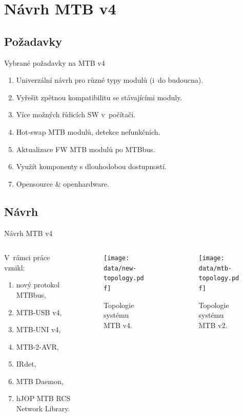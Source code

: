 \documentclass[aspectratio=169]{beamer}
\begin{document}

\section{Návrh MTB v4}
\subsection{Požadavky}

\begin{frame}{Vybrané požadavky na MTB v4}
\begin{enumerate}
\item Univerzální návrh pro různé typy modulů (i do budoucna).
\item Vyřešit zpětnou kompatibilitu se stávajícími moduly.
\item Více možných řídicích SW v počítači.
\item Hot-swap MTB modulů, detekce nefunkčních.
\item Aktualizace FW MTB modulů po MTBbus.
\item Využít komponenty s dlouhodobou dostupností.
\item Opensource \& openhardware.
\end{enumerate}
\end{frame}


\subsection{Návrh}

\begin{frame}{Návrh MTB v4}
\begin{columns}
	\begin{column}{.3\textwidth}
		V rámci práce vznikl:
		\begin{enumerate}
		\item nový protokol MTBbus,
		\item MTB-USB v4,
		\item MTB-UNI v4,
		\item MTB-2-AVR,
		\item IRdet,
		\item MTB Daemon,
		\item hJOP MTB RCS Network Library.
		\end{enumerate}
	\end{column}
	\begin{column}{.4\textwidth}
		\begin{figure}
		\texttt{[image: data/new-topology.pdf]}
		\caption{Topologie systému MTB v4.}
		\end{figure}
	\end{column}
	\begin{column}{.3\textwidth}
		\begin{figure}
		\texttt{[image: data/mtb-topology.pdf]}
		\caption{Topologie systému MTB v2.}
		\end{figure}
	\end{column}
\end{columns}
\end{frame}
\end{document}
